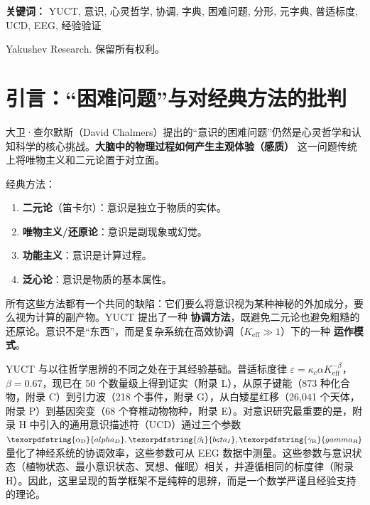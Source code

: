 \documentclass[12pt,a4paper]{article}
\DeclareRobustCommand{\alD}{\texorpdfstring{\ensuremath{\alpha_{\mathrm{D}}}}{alpha_D}}
\DeclareRobustCommand{\beI}{\texorpdfstring{\ensuremath{\beta_{\mathrm{I}}}}{beta_I}}
\DeclareRobustCommand{\gaR}{\texorpdfstring{\ensuremath{\gamma_{\mathrm{R}}}}{gamma_R}}
\newcommand{\eff}{\mathrm{eff}}
\newcommand{\Ke}{K_{\eff}}
\begin{document}
\begin{titlepage}
\begin{center}
\begin{abstract}
				哲学含义包括：（1）意识自然化但不还原；（2）将心智进化理解为协调字典复杂性增长的新视角；（3）非人形态意识（人工、集体、行星）的可能性；（4）与暗物质/暗能量的联系，视为宇宙协调的极限。YUCT 不仅为“困难问题”提供了解决方案，而且为神经科学、物理学和人文学科之间的对话提供了一个统一的哲学平台，现已得到经验验证。
			\end{abstract}
			
			\vspace{0cm}
			
			\noindent
			\small\textbf{关键词：} YUCT, 意识, 心灵哲学, 协调, 字典, 困难问题, 分形, 元字典, 普适标度, UCD, EEG, 经验验证
			
			\vspace{0.5cm}
			
			\noindent
			 Yakushev Research. 保留所有权利。
		\end{center}
	\end{titlepage}
	
	\tableofcontents
	
	\newpage
	
	\section{引言：“困难问题”与对经典方法的批判}
	
	大卫·查尔默斯（David Chalmers）提出的“意识的困难问题”仍然是心灵哲学和认知科学的核心挑战。\textbf{大脑中的物理过程如何产生主观体验（感质）} 这一问题传统上将唯物主义和二元论置于对立面。
	
	经典方法：
	\begin{enumerate}
		\item \textbf{二元论}（笛卡尔）：意识是独立于物质的实体。
		\item \textbf{唯物主义/还原论}：意识是副现象或幻觉。
		\item \textbf{功能主义}：意识是计算过程。
		\item \textbf{泛心论}：意识是物质的基本属性。
	\end{enumerate}
	
	所有这些方法都有一个共同的缺陷：它们要么将意识视为某种神秘的外加成分，要么视为计算的副产物。YUCT 提出了一种 \textbf{协调方法}，既避免二元论也避免粗糙的还原论。意识不是“东西”，而是复杂系统在高效协调（\(\Ke \gg 1\)）下的一种 \textbf{运作模式}。
	
	YUCT 与以往哲学思辨的不同之处在于其经验基础。普适标度律 \(\varepsilon = \kappa_c \alpha \Ke^{-\beta}\)，\(\beta = 0.67\)，现已在 50 个数量级上得到证实（附录 L），从原子键能（873 种化合物，附录 C）到引力波（218 个事件，附录 G），从白矮星红移（26,041 个天体，附录 P）到基因突变（68 个脊椎动物物种，附录 E）。对意识研究最重要的是，附录 H 中引入的通用意识描述符（UCD）通过三个参数 \(\alD, \beI, \gaR\) 量化了神经系统的协调效率，这些参数可从 EEG 数据中测量。这些参数与意识状态（植物状态、最小意识状态、冥想、催眠）相关，并遵循相同的标度律（附录 H）。因此，这里呈现的哲学框架不是纯粹的思辨，而是一个数学严谨且经验支持的理论。
	
\end{document}
